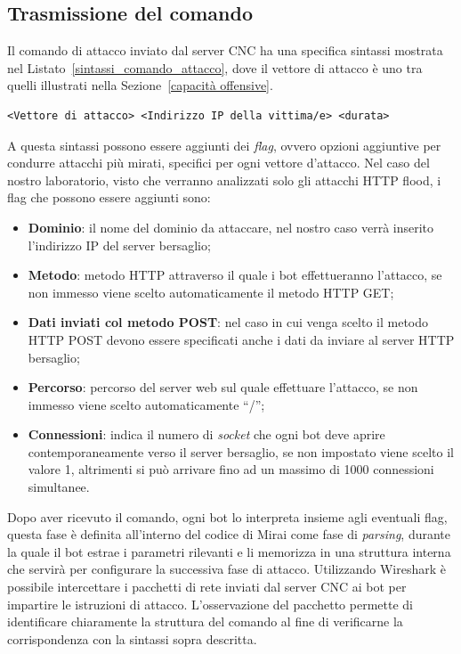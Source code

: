 \subsection{Trasmissione del comando}
Il comando di attacco inviato dal server CNC ha una specifica sintassi mostrata nel Listato~\ref{sintassi_comando_attacco}, dove il vettore di attacco è uno tra quelli illustrati nella Sezione~\ref{capacità offensive}.
\begin{lstlisting}[caption={Sintassi generica di un comando di attacco in Mirai.}, label={sintassi_comando_attacco}]
    <Vettore di attacco> <Indirizzo IP della vittima/e> <durata>
\end{lstlisting} 
A questa sintassi possono essere aggiunti dei \emph{flag}, ovvero opzioni aggiuntive per condurre attacchi più mirati, specifici per ogni vettore d'attacco. Nel caso del nostro laboratorio, visto che verranno analizzati solo gli attacchi HTTP flood, i flag che possono essere aggiunti sono:
\begin{itemize}
    \item \textbf{Dominio}: il nome del dominio da attaccare, nel nostro caso verrà inserito l'indirizzo IP del server bersaglio;
    \item \textbf{Metodo}: metodo HTTP attraverso il quale i bot effettueranno l'attacco, se non immesso viene scelto automaticamente il metodo HTTP GET;
    \item \textbf{Dati inviati col metodo POST}: nel caso in cui venga scelto il metodo HTTP POST devono essere specificati anche i dati da inviare al server HTTP bersaglio;
    \item \textbf{Percorso}: percorso del server web sul quale effettuare l'attacco, se non immesso viene scelto automaticamente ``/'';
    \item \textbf{Connessioni}: indica il numero di \emph{socket} che ogni bot deve aprire contemporaneamente verso il server bersaglio, se non impostato viene scelto il valore 1, altrimenti si può arrivare fino ad un massimo di 1000 connessioni simultanee.
\end{itemize}
Dopo aver ricevuto il comando, ogni bot lo interpreta insieme agli eventuali flag, questa fase è definita all'interno del codice di Mirai come fase di \emph{parsing}, durante la quale il bot estrae i parametri rilevanti e li memorizza in una struttura interna che servirà per configurare la successiva fase di attacco. Utilizzando Wireshark è possibile intercettare i pacchetti di rete inviati dal server CNC ai bot per impartire le istruzioni di attacco. L'osservazione del pacchetto permette di identificare chiaramente la struttura del comando al fine di verificarne la corrispondenza con la sintassi sopra descritta.

